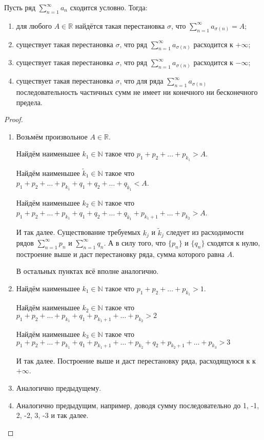 	\begin{Theorem}[Римана]
		Пусть ряд $\sum\limits_{n=1}^{\infty}a_n$ сходится условно. Тогда:
		\begin{enumerate}
			\item для любого $A \in \mathbb{R}$ найдётся такая перестановка $\sigma$, что $\sum\limits_{n=1}^{\infty}a_{\sigma(n)} = A $;
			\item существует такая перестановка $\sigma$, что ряд $\sum\limits_{n=1}^{\infty}a_{\sigma(n)}$ расходится к $+\infty$;
			\item существует такая перестановка $\sigma$, что ряд $\sum\limits_{n=1}^{\infty}a_{\sigma(n)}$ расходится к $-\infty$;
			\item существует такая перестановка $\sigma$, что для ряда $\sum\limits_{n=1}^{\infty}a_{\sigma(n)}$ последовательность частичных сумм не имеет ни конечного ни бесконечного предела.
		\end{enumerate}
	\end{Theorem}
	\begin{proof} \ 
		\begin{enumerate}
			\item Возьмём произвольное $A \in \mathbb{R}$.  
			
			Найдём наименьшее $k_1 \in \mathbb{N}$ такое что $p_1+p_2+\dots+p_{k_1} > A$. 
			
			Найдём наименьшее $\tilde{k}_1 \in \mathbb{N}$ такое что $p_1+p_2+\dots+p_{k_1} + q_1+q_2 +\dots +q_{\tilde{k}_1} < A$.
			
			Найдём наименьшее $k_2 \in \mathbb{N}$ такое что $p_1+p_2+\dots+p_{k_1} + q_1+q_2 +\dots +q_{\tilde{k}_1}+ p_{k_1+1}+\dots+p_{k_2} > A$.
			
			И так далее. Существование требуемых $k_j$ и $\tilde{k}_j$ следует из расходимости рядов $\sum\limits_{n=1}^{\infty}p_n$ и $\sum\limits_{n=1}^{\infty}q_n$. А в силу того, что $\{p_n\}$ и $\{q_n\}$ сходятся к нулю, построение выше и даст перестановку ряда, сумма которого равна $A$.
			
			В остальных пунктах всё вполне аналогично.
			\item 
			Найдём наименьшее $k_1 \in \mathbb{N}$ такое что $p_1+p_2+\dots+p_{k_1} > 1$. 
			
			Найдём наименьшее $k_2 \in \mathbb{N}$ такое что $p_1+p_2+\dots+p_{k_1} + q_1+ p_{k_1+1}+\dots+p_{k_2} > 2$ 

			Найдём наименьшее $k_3 \in \mathbb{N}$ такое что $p_1+p_2+\dots+p_{k_1} + q_1+ p_{k_1+1}+\dots+p_{k_2} + q_2
			+ p_{k_2+1}+\dots+p_{k_3} > 3$ 

			И так далее. Построение выше и даст перестановку ряда, расходящуюся к к $+\infty$.
			\item Аналогично предыдущему.
			\item Аналогично предыдущим, например, доводя сумму последовательно до 1, -1, 2, -2, 3, -3 и так далее.
		\end{enumerate}
	\end{proof}

